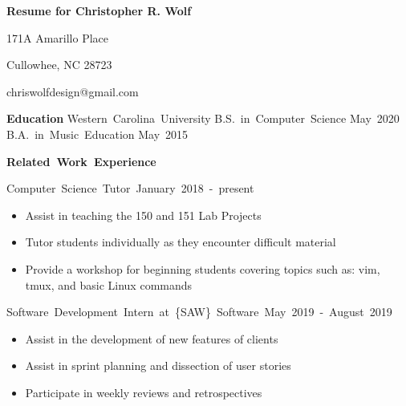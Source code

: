 \documentclass[12pt]{letter}
\begin{document}
    \thispagestyle{empty} %

    \centerline{\textbf{\large Resume for Christopher R. Wolf}}
    \centerline{171A Amarillo Place}
    \centerline{Cullowhee, NC 28723}
    \centerline{chriswolfdesign@gmail.com}

    \vspace{10 mm}
    \textbf{\large Education}
    \vspace{3 mm}
    \hbox{Western Carolina University}
    \linebreak
    \hbox{B.S. in Computer Science} \hspace{200pt} \hbox{May 2020}
    \linebreak
    \hbox{B.A. in Music Education} \hspace{285pt} \hbox{May 2015}

    \vspace {10 mm}
    \hbox{\textbf{\large {Related Work Experience}}}
    \vspace{3 mm}

    \hbox{Computer Science Tutor \hspace{250pt} January 2018 - present}
    \vspace{0.5 mm}
    \begin{itemize}
        \itemsep 0em
        \item Assist in teaching the 150 and 151 Lab Projects
        \item Tutor students individually as they encounter difficult material
        \item Provide a workshop for beginning students covering topics such 
            as: vim, tmux, and basic Linux commands
    \end{itemize}

    \vspace{2 mm}
    \hbox{Software Development Intern at \{SAW\} Software \hspace{115pt}
        May 2019 - August 2019}
    \vspace{0.5 mm}
    \begin{itemize}
        \itemsep 0em
        \item Assist in the development of new features of clients
        \item Assist in sprint planning and dissection of user stories
        \item Participate in weekly reviews and retrospectives
    \end{itemize}
\end{document}
